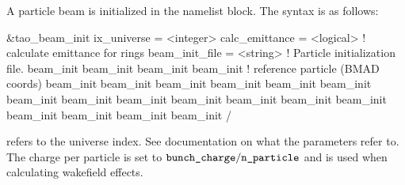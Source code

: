 {A particle beam is initialized in the  namelist block.
The syntax is as follows:
\begin{example}
  &tao_beam_init
    ix_universe             = <integer>
    calc_emittance          = <logical>   ! calculate emittance for rings
    beam_init_file          = <string>    ! Particle initialization file.
    beam_init%
    beam_init%
    beam_init%
    beam_init%
                                          ! reference particle (BMAD coords)
    beam_init%
    beam_init%
    beam_init%
    beam_init%
    beam_init%
    beam_init%
    beam_init%
    beam_init%
    beam_init%
    beam_init%
    beam_init%
    beam_init%
    beam_init%
    beam_init%
    beam_init%
    beam_init%
    beam_init%
  /
\end{example}
 refers to the universe index. See \bmad documentation on what
the  parameters refer to. The charge per particle is set to
$\vn{bunch_charge} / \vn{n_particle}$ and is used when calculating wakefield
effects.

}
